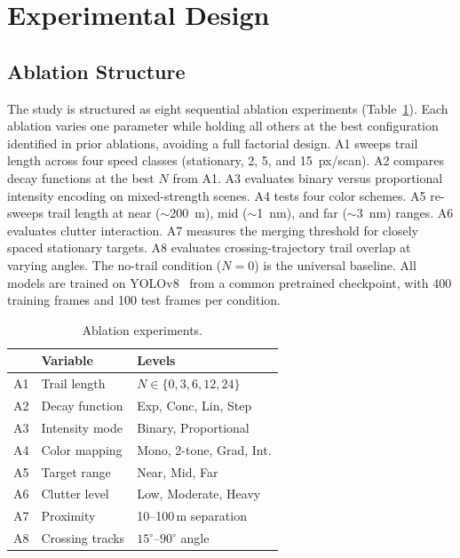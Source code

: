 \documentclass[colorlinks,upint,balance]{asmeconf}
\begin{document}
\section{Experimental Design}

\subsection{Ablation Structure}

The study is structured as eight sequential ablation experiments (Table~\ref{tab:ablations}). Each ablation varies one parameter while holding all others at the best configuration identified in prior ablations, avoiding a full factorial design. A1 sweeps trail length across four speed classes (stationary, 2, 5, and 15~px/scan). A2 compares decay functions at the best $N$ from A1. A3 evaluates binary versus proportional intensity encoding on mixed-strength scenes. A4 tests four color schemes. A5 re-sweeps trail length at near ($\sim$200~m), mid ($\sim$1~nm), and far ($\sim$3~nm) ranges. A6 evaluates clutter interaction. A7 measures the merging threshold for closely spaced stationary targets. A8 evaluates crossing-trajectory trail overlap at varying angles. The no-trail condition ($N=0$) is the universal baseline. All models are trained on YOLOv8~\cite{Jocher2023YOLOv8} from a common pretrained checkpoint, with 400 training frames and 100 test frames per condition.

\begin{table}[t]
\caption{Ablation experiments.}
\label{tab:ablations}
\centering
\footnotesize
\begin{tabular}{@{}lll@{}}
\toprule
 & \textbf{Variable} & \textbf{Levels} \\
\midrule
A1 & Trail length & $N \in \{0,3,6,12,24\}$ \\
A2 & Decay function & Exp, Conc, Lin, Step \\
A3 & Intensity mode & Binary, Proportional \\
A4 & Color mapping & Mono, 2-tone, Grad, Int. \\
A5 & Target range & Near, Mid, Far \\
A6 & Clutter level & Low, Moderate, Heavy \\
A7 & Proximity & 10--100\,m separation \\
A8 & Crossing tracks & $15^\circ$--$90^\circ$ angle \\
\bottomrule
\end{tabular}
\end{table}
\end{document}
